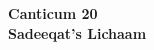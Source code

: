 \clearpage
\vspace*{\fill}
\begin{center}
\Huge \textbf{Canticum 20} \\
\vspace{0.5em}
\Huge \textbf{Sadeeqat’s Lichaam}

\end{center}
\vspace*{\fill}
\clearpage

